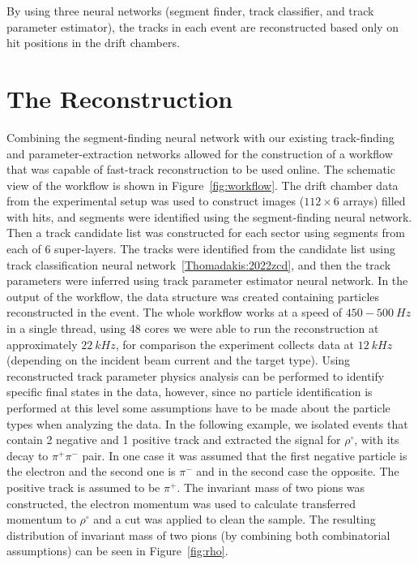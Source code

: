 \documentclass[preprint,12pt]{elsarticle}
\begin{document}
By using three neural networks (segment finder, track classifier, and track parameter estimator), the tracks in each event are reconstructed based only on hit positions in the drift chambers. 

\section{The Reconstruction}

Combining the segment-finding neural network with our existing track-finding and parameter-extraction networks allowed for the construction of a workflow that was capable of fast-track reconstruction to be used online. The schematic view of the workflow is shown in Figure~\ref{fig:workflow}.
The drift chamber data from the experimental setup was used to construct images ($112\times6$ arrays) filled with hits, and segments were identified 
using the segment-finding neural network. Then a track candidate list was constructed for each sector using segments from each of 6 super-layers.
The tracks were identified from the candidate list using track classification neural network~\ref{Thomadakis:2022zcd}, and then the track parameters were inferred using track parameter estimator neural network. In the output of the workflow, the data structure was created containing particles reconstructed in the event. The whole workflow works at a speed of $450-500~Hz$ in a single thread, using 48 cores we were able to run the reconstruction at approximately $22~kHz$, for comparison the experiment collects data at $12~kHz$ (depending on the incident beam current and the target type).
Using reconstructed track parameter physics analysis can be performed to identify specific final states in the data, however, since no particle identification is performed at this level some assumptions have to be made about the particle types when analyzing the data. In the following example, we isolated events that contain 2 negative and 1 positive track and extracted the signal for $\rho^\circ$, with its decay to $\pi^+\pi^-$ pair. In one case it was assumed that the first negative particle is the electron and the second one is $\pi^-$ and in the second case the opposite. The positive track is assumed to be $\pi^+$. The invariant mass of two pions was constructed, the electron momentum was used to calculate transferred momentum to $\rho^\circ$ and a cut was applied to clean the sample. The resulting distribution of invariant mass of two pions (by combining both combinatorial assumptions) can be seen in Figure~\ref{fig:rho}.
\end{document}
